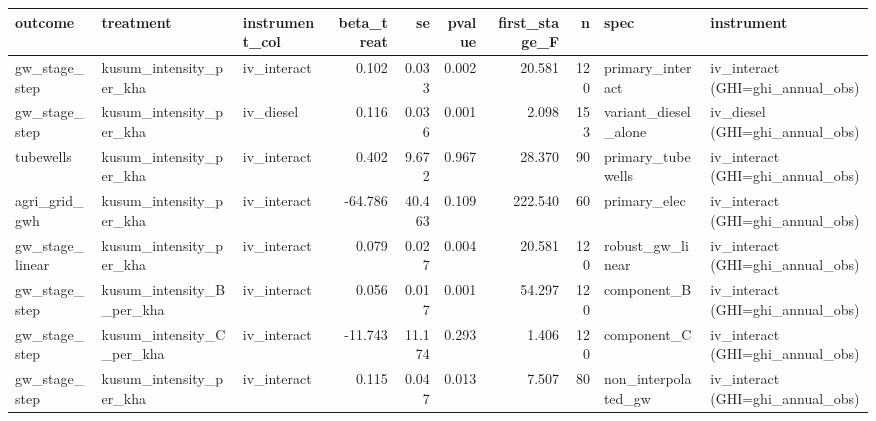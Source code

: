 \begin{tabular}{lllrrrrrll}
\toprule
outcome & treatment & instrument_col & beta_treat & se & pvalue & first_stage_F & n & spec & instrument \\
\midrule
gw_stage_step & kusum_intensity_per_kha & iv_interact & 0.102 & 0.033 & 0.002 & 20.581 & 120 & primary_interact & iv_interact (GHI=ghi_annual_obs) \\
gw_stage_step & kusum_intensity_per_kha & iv_diesel & 0.116 & 0.036 & 0.001 & 2.098 & 153 & variant_diesel_alone & iv_diesel (GHI=ghi_annual_obs) \\
tubewells & kusum_intensity_per_kha & iv_interact & 0.402 & 9.672 & 0.967 & 28.370 & 90 & primary_tubewells & iv_interact (GHI=ghi_annual_obs) \\
agri_grid_gwh & kusum_intensity_per_kha & iv_interact & -64.786 & 40.463 & 0.109 & 222.540 & 60 & primary_elec & iv_interact (GHI=ghi_annual_obs) \\
gw_stage_linear & kusum_intensity_per_kha & iv_interact & 0.079 & 0.027 & 0.004 & 20.581 & 120 & robust_gw_linear & iv_interact (GHI=ghi_annual_obs) \\
gw_stage_step & kusum_intensity_B_per_kha & iv_interact & 0.056 & 0.017 & 0.001 & 54.297 & 120 & component_B & iv_interact (GHI=ghi_annual_obs) \\
gw_stage_step & kusum_intensity_C_per_kha & iv_interact & -11.743 & 11.174 & 0.293 & 1.406 & 120 & component_C & iv_interact (GHI=ghi_annual_obs) \\
gw_stage_step & kusum_intensity_per_kha & iv_interact & 0.115 & 0.047 & 0.013 & 7.507 & 80 & non_interpolated_gw & iv_interact (GHI=ghi_annual_obs) \\
\bottomrule
\end{tabular}
